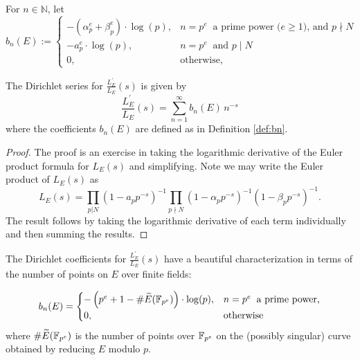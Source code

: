 \documentclass[10pt]{article}
\newcommand{\NN}{\mathbb{N}}
\newcommand{\pr}{^{\prime}}
\newcommand{\Les}{L_E(s)}
\newcommand{\ldLes}{\frac{L_E\pr}{L_E}(s)}
\begin{document}
\begin{definition}\label{def:bn}
For $n \in \NN$, let
\begin{equation}
b_n(E) := \begin{cases}
-\left(\alpha_p^e+\beta_p^e\right)\cdot \log(p), & n=p^e\;\;\text{a prime power ($e\ge1$), and $p \nmid N$} \\
-a_p^e \cdot \log(p), & n=p^e\;\;\text{and $p \mid N$} \\
0, & \text{otherwise,} \end{cases}
\end{equation}
\end{definition}

\begin{lemma}
The Dirichlet series for $\ldLes$ is given by
\begin{equation}
\ldLes = \sum_{n=1}^{\infty} b_n(E)\, n^{-s}
\end{equation}
where the coefficients $b_n(E)$ are defined as in Definition \ref{def:bn}. \\
\end{lemma}
\begin{proof}
The proof is an exercise in taking the logarithmic derivative of the Euler product formula for $\Les$ and simplifying. Note we may write the Euler product of $\Les$ as
\begin{equation}
\Les = \prod_{p|N} \left(1-a_p p^{-s}\right)^{-1} \prod_{p\nmid N} \left(1-\alpha_p p^{-s}\right)^{-1}\left(1-\beta_p p^{-s}\right)^{-1}.
\end{equation}
The result follows by taking the logarithmic derivative of each term individually and then summing the results.
\end{proof}

The Dirichlet coefficients for $\ldLes$ have a beautiful characterization in terms of the number of points on $E$ over finite fields:
\begin{theorem}[S.]
\begin{equation}
b_n(E) = \begin{cases}
-\left(p^e + 1 - \#\widetilde{E}(\mathbb{F}_{p^e})\right)\cdot \log(p), & n=p^e\;\;\text{a prime power,} \\
0, & \text{otherwise} \end{cases}
\end{equation}
where $\#\widetilde{E}(\mathbb{F}_{p^e})$ is the number of points over $\mathbb{F}_{p^e}$ on the (possibly singular) curve obtained by reducing $E$ modulo $p$.
\end{theorem}
\end{document}
